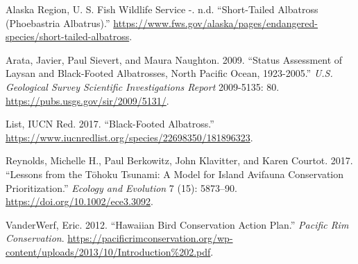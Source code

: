 \documentclass[
]{article}
\newlength{\cslhangindent}
\newlength{\cslentryspacingunit} %
\newenvironment{CSLReferences}[2] %
 {%
  \setlength{\parindent}{0pt}
  \ifodd #1
  \let\oldpar\par
  \def\par{\hangindent=\cslhangindent\oldpar}
  \fi
  \setlength{\parskip}{#2\cslentryspacingunit}
 }%
 {}
\begin{document}
\hypertarget{refs}{}
\begin{CSLReferences}{1}{0}
\leavevmode{}%
Alaska Region, U. S. Fish Wildlife Service -. n.d. {``Short-Tailed
Albatross (Phoebastria Albatrus).''}
\url{https://www.fws.gov/alaska/pages/endangered-species/short-tailed-albatross}.

\leavevmode{}%
Arata, Javier, Paul Sievert, and Maura Naughton. 2009. {``Status
Assessment of Laysan and Black-Footed Albatrosses, North Pacific Ocean,
1923-2005.''} \emph{U.S. Geological Survey Scientific Investigations
Report} 2009-5135: 80. \url{https://pubs.usgs.gov/sir/2009/5131/}.

\leavevmode{}%
List, IUCN Red. 2017. {``Black-Footed Albatross.''}
\url{https://www.iucnredlist.org/species/22698350/181896323}.

\leavevmode{}%
Reynolds, Michelle H., Paul Berkowitz, John Klavitter, and Karen
Courtot. 2017. {``Lessons from the Tōhoku Tsunami: A Model for Island
Avifauna Conservation Prioritization.''} \emph{Ecology and Evolution} 7
(15): 5873--90. \url{https://doi.org/10.1002/ece3.3092}.

\leavevmode{}%
VanderWerf, Eric. 2012. {``Hawaiian Bird Conservation Action Plan.''}
\emph{Pacific Rim Conservation}.
\url{https://pacificrimconservation.org/wp-content/uploads/2013/10/Introduction\%202.pdf}.

\end{CSLReferences}
\end{document}
